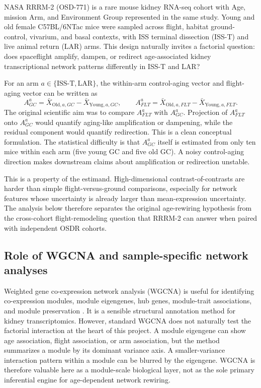 \documentclass[11pt]{article}
\begin{document}
NASA RRRM-2 (OSD-771) is a rare mouse kidney RNA-seq cohort with Age, mission Arm, and Environment Group represented in the same study. Young and old female C57BL/6NTac mice were sampled across flight, habitat ground-control, vivarium, and basal contexts, with ISS terminal dissection (ISS-T) and live animal return (LAR) arms. This design naturally invites a factorial question: does spaceflight amplify, dampen, or redirect age-associated kidney transcriptional network patterns differently in ISS-T and LAR?

For an arm $a\in\{\mathrm{ISS\mbox{-}T},\mathrm{LAR}\}$, the within-arm control-aging vector and flight-aging vector can be written as
\begin{equation}
A^a_{GC}=\bar{X}_{\mathrm{Old},a,GC}-\bar{X}_{\mathrm{Young},a,GC},
\qquad
A^a_{FLT}=\bar{X}_{\mathrm{Old},a,FLT}-\bar{X}_{\mathrm{Young},a,FLT}.
\end{equation}
The original scientific aim was to compare $A^a_{FLT}$ with $A^a_{GC}$. Projection of $A^a_{FLT}$ onto $A^a_{GC}$ would quantify aging-like amplification or dampening, while the residual component would quantify redirection. This is a clean conceptual formulation. The statistical difficulty is that $A^a_{GC}$ itself is estimated from only ten mice within each arm (five young GC and five old GC). A noisy control-aging direction makes downstream claims about amplification or redirection unstable.

This is a property of the estimand. High-dimensional contrast-of-contrasts are harder than simple flight-versus-ground comparisons, especially for network features whose uncertainty is already larger than mean-expression uncertainty. The analysis below therefore separates the original age-rewiring hypothesis from the cross-cohort flight-remodeling question that RRRM-2 can answer when paired with independent OSDR cohorts.

\subsection{Role of WGCNA and sample-specific network analyses}

Weighted gene co-expression network analysis (WGCNA) is useful for identifying co-expression modules, module eigengenes, hub genes, module-trait associations, and module preservation \citep{langfelder2008wgcna,langfelder2011preservation}. It is a sensible structural annotation method for kidney transcriptomics. However, standard WGCNA does not naturally test the factorial interaction at the heart of this project. A module eigengene can show age association, flight association, or arm association, but the method summarizes a module by its dominant variance axis. A smaller-variance interaction pattern within a module can be blurred by the eigengene. WGCNA is therefore valuable here as a module-scale biological layer, not as the sole primary inferential engine for age-dependent network rewiring.
\end{document}
